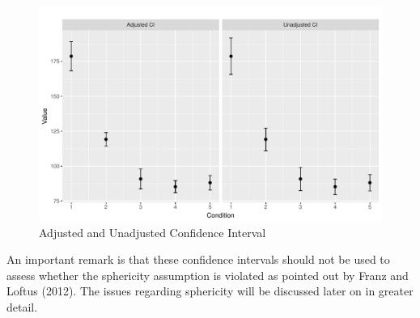 \documentclass[11pt]{article}
\begin{document}
		\begin{figure}[htb]
			\begin{center}
				\includegraphics[scale=0.6]{CIs}
				\caption{Adjusted and Unadjusted Confidence Interval}
			\end{center}
		\end{figure}
		
		An important remark is that these confidence intervals should not be used to assess whether the sphericity assumption is violated as pointed out by Franz and Loftus (2012). The issues regarding sphericity will be discussed later on in greater detail.
		
\end{document}
